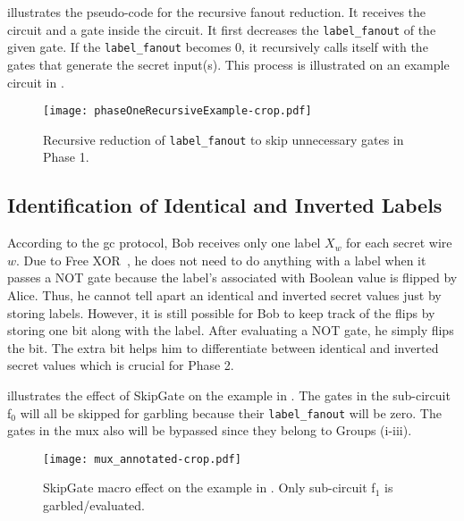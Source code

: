  illustrates the pseudo-code for the recursive fanout reduction.
It receives the circuit and a gate inside the circuit.
It first decreases the \texttt{label\_fanout} of the given gate.
If the \texttt{label\_fanout} becomes 0, it recursively calls itself with the gates that generate the secret input(s).
This process is illustrated on an example circuit in .

\begin{figure}[h]
    \centering
    \texttt{[image: phaseOneRecursiveExample-crop.pdf]}
    \caption{Recursive reduction of \texttt{label\_fanout} to skip unnecessary gates in Phase 1.}
    \label{fig:phaseOneRecursive}
\end{figure}

\subsection{Identification of Identical and Inverted Labels}\label{ssec:skipgate-ident}
According to the \acrshort{gc} protocol, Bob receives only one label $X_w$ for each secret wire $w$.
Due to Free XOR~\cite{kolesnikov2008improved}, he does not need to do anything with a label when it passes a NOT gate because the label's associated with Boolean value is flipped by Alice.
Thus, he cannot tell apart an identical and inverted secret values just by storing labels.
However, it is still possible for Bob to keep track of the flips by storing one bit along with the label.
After evaluating a NOT gate, he simply flips the bit.
The extra bit helps him to differentiate between identical and inverted secret values which is crucial for Phase 2.

 illustrates the effect of SkipGate on the example in .
The gates in the sub-circuit f$_0$ will all be skipped for garbling because their \texttt{label\_fanout} will be zero.
The gates in the \acrshort{mux} also will be bypassed since they belong to Groups (i-iii).

\begin{figure}[h]
    \centering
    \texttt{[image: mux\_annotated-crop.pdf]}
    \caption{SkipGate macro effect on the example in .
    		 Only sub-circuit f$_1$ is garbled/evaluated.}
\label{fig:mux_annotated}
\end{figure}

